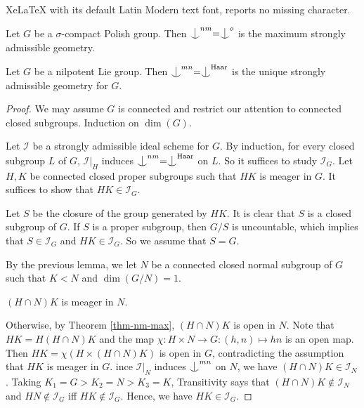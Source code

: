\documentclass[10pt,a4paper]{amsart}
\newcommand{\HH}{\mathrm{Haar}}
\newcommand{\I}{\mathcal{I}}
\newenvironment{claimproof}[1][\proofname]
               {
                 \proof[#1]
                 \renewcommand*\qedsymbol{$\square$\rlap{\textsubscript{Claim}}}
               }
\newcommand{\ind}{\mathrel{\raise0.2ex\hbox{\ooalign{\hidewidth$\vert$\hidewidth\cr\raise-0.9ex\hbox{$\smile$}}}}}
\begin{document}
XeLaTeX with its default Latin Modern text font, reports no missing character.
\begin{theorem}\label{thm-nm-max}
Let $G$ be a $\sigma$-compact Polish group. Then $\ind^{nm}=\ind^o$ is the maximum strongly admissible geometry. 
\end{theorem}

\begin{theorem}\label{nil-unique}
Let $G$ be a nilpotent Lie group. Then $\ind^{mn}=\ind^\HH$ is the unique strongly admissible geometry for $G$. 
\end{theorem}

\begin{proof}
We may assume $G$ is connected and restrict our attention to connected closed subgroups. Induction on $\dim(G)$.

Let $\I$ be a strongly admissible ideal scheme for $G$. By induction, for every closed subgroup $L$ of $G$, $\I|_H$ induces $\ind^{nm}=\ind^\HH$ on $L$. So it suffices to study $\I_G$.  Let $H,K$ be connected closed proper subgroups such that $HK$ is meager in $G$. It suffices to show that $HK\in \I_G$.

Let $S$ be the closure of the group generated by $HK$. It is clear that $S$ is a closed subgroup of $G$. If $S$ is a proper subgroup, then $G/S$ is uncountable, which implies that $S\in \I_G$ and $HK\in \I_G$. So we assume that $S=G$.

By the previous lemma, we let $N$ be a  connected closed normal subgroup of $G$ such that $K<N$ and $\dim(G/N)=1$. 

\begin{claim}
$(H\cap N)K$ is meager in $N$.
\end{claim}
\begin{claimproof}
Otherwise, by Theorem \ref{thm-nm-max}, $(H\cap N)K$ is open in $N$. Note that $HK=H(H\cap N)K$ and the map $\chi: H\times N\rightarrow G:(h,n)\mapsto hn$ is an open map. Then $HK=\chi(H\times (H\cap N)K)$ is open in $G$, contradicting the assumption that $HK$ is meager in $G$.
\end{claimproof}

Since $\I|_N$ induces $\ind^{mn}$ on $N$, we have  $(H\cap N)K\in \I_N$. Taking $K_1=G>K_2=N>K_3=K$, Transitivity says that $(H\cap N)K\notin \I_N$ and $HN\notin \I_G$ iff $HK\notin \I_G$. Hence, we have $HK\in \I_G$.
\end{proof}
\end{document}
